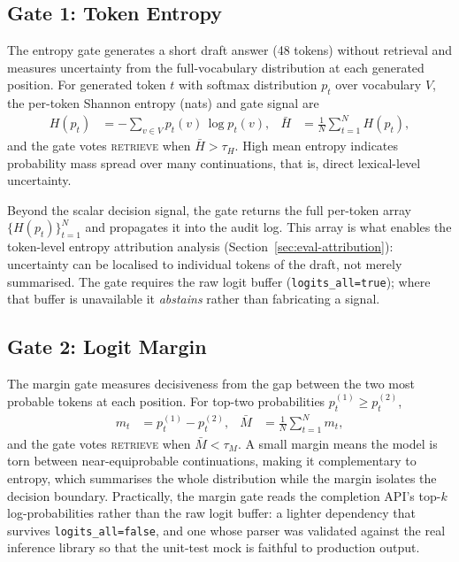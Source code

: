 \subsection{Gate 1: Token Entropy}
\label{sec:method-gate-entropy}

The entropy gate generates a short draft answer (48 tokens) without retrieval
and measures uncertainty from the full-vocabulary distribution at each
generated position. For generated token $t$ with softmax distribution $p_t$
over vocabulary $V$, the per-token Shannon entropy (nats) and gate signal are
\begin{align}
  H(p_t) &= -\sum_{v \in V} p_t(v)\,\log p_t(v), &
  \bar{H} &= \frac{1}{N}\sum_{t=1}^{N} H(p_t),
  \label{eq:entropy}
\end{align}
and the gate votes \textsc{retrieve} when $\bar{H} > \tau_H$. High mean
entropy indicates probability mass spread over many continuations, that is, direct
lexical-level uncertainty.

Beyond the scalar decision signal, the gate returns the full per-token array
$\{H(p_t)\}_{t=1}^N$ and propagates it into the audit log. This array is what
enables the token-level entropy attribution analysis
(Section~\ref{sec:eval-attribution}): uncertainty can be localised to
individual tokens of the draft, not merely summarised. The gate requires the
raw logit buffer (\texttt{logits\_all=true}); where that buffer is
unavailable it \emph{abstains} rather than fabricating a signal.

\subsection{Gate 2: Logit Margin}
\label{sec:method-gate-margin}

The margin gate measures decisiveness from the gap between the two most
probable tokens at each position. For top-two probabilities
$p_t^{(1)} \ge p_t^{(2)}$,
\begin{align}
  m_t &= p_t^{(1)} - p_t^{(2)}, &
  \bar{M} &= \frac{1}{N}\sum_{t=1}^{N} m_t,
  \label{eq:margin}
\end{align}
and the gate votes \textsc{retrieve} when $\bar{M} < \tau_M$. A small margin
means the model is torn between near-equiprobable continuations, making it
complementary to entropy, which summarises the whole distribution while the
margin isolates the decision boundary. Practically, the margin gate reads the
completion API's top-$k$ log-probabilities rather than the raw logit buffer:
a lighter dependency that survives \texttt{logits\_all=false}, and one whose
parser was validated against the real inference library so that the unit-test
mock is faithful to production output.

